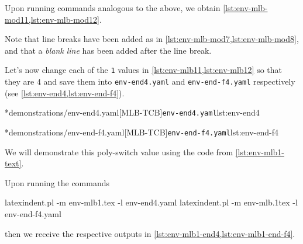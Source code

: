 	Upon running commands analogous to the above, we obtain \cref{lst:env-mlb-mod11,lst:env-mlb-mod12}.

	\begin{widepage}
		\begin{minipage}{.42\linewidth}
		\end{minipage}
		\hfill
		\begin{minipage}{.57\linewidth}
		\end{minipage}
	\end{widepage}

	Note that line breaks have been added as in \cref{lst:env-mlb-mod7,lst:env-mlb-mod8}, and that a
	\emph{blank line} has been added after the line break.

	Let's now change%
	 each
	of the \texttt{1} values in \cref{lst:env-mlb11,lst:env-mlb12} so that they
	are $4$ and save them into \texttt{env-end4.yaml} and
	\texttt{env-end-f4.yaml} respectively (see \cref{lst:env-end4,lst:env-end-f4}).

	\begin{minipage}{.45\textwidth}
		\cmhlistingsfromfile[style=yaml-LST]*{demonstrations/env-end4.yaml}[MLB-TCB]{\texttt{env-end4.yaml}}{lst:env-end4}
	\end{minipage}
	\hfill
	\begin{minipage}{.5\textwidth}
		\cmhlistingsfromfile[style=yaml-LST]*{demonstrations/env-end-f4.yaml}[MLB-TCB]{\texttt{env-end-f4.yaml}}{lst:env-end-f4}
	\end{minipage}

	We will demonstrate this poly-switch value using the code from
	\vref{lst:env-mlb1-text}.

	Upon running the commands
	\begin{commandshell}
latexindent.pl -m env-mlb1.tex -l env-end4.yaml
latexindent.pl -m env-mlb.1tex -l env-end-f4.yaml
\end{commandshell}

	then we receive the respective outputs in \cref{lst:env-mlb1-end4,lst:env-mlb1-end-f4}.

	\begin{cmhtcbraster}[raster column skip=.1\linewidth]
	\end{cmhtcbraster}

